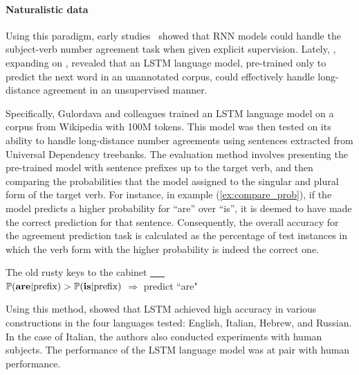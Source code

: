 \paragraph{Naturalistic data} Using this paradigm, early studies~\citep{linzen-etal-2016-assessing,bernardy-lappin-2017-using} showed that RNN models could handle the subject-verb number agreement task when given explicit supervision. Lately, \cite{gulordava-etal-2018-colorless}, expanding on \cite{linzen-etal-2016-assessing}, revealed that an LSTM language model, pre-trained only to predict the next word in an unannotated corpus, could effectively handle long-distance agreement in an unsupervised manner. 

Specifically, Gulordava and colleagues trained an LSTM language model on a corpus from Wikipedia with 100M tokens. This model was then tested on its ability to handle long-distance number agreements using sentences extracted from Universal Dependency treebanks. The evaluation method involves presenting the pre-trained model with sentence prefixes up to the target verb, and then comparing the probabilities that the model assigned to the singular and plural form of the target verb. For instance, in example (\ref{ex:compare_prob}), if the model predicts a higher probability for ``are'' over ``is'', it is deemed to have made the correct prediction for that sentence. Consequently, the overall accuracy for the agreement prediction task is calculated as the percentage of test instances in which the verb form with the higher probability is indeed the correct one.
\begin{exe}
   \ex\label{ex:compare_prob}
The old rusty keys to the cabinet \underline{\ \ \ }   \\
$\mathbb{P}(\textrm{\bf are}|\textrm{prefix}) >
      \mathbb{P}(\textrm{\bf is}|\textrm{prefix})$ $\Rightarrow$ predict ``are" 
\end{exe}

\noindent Using this method, \cite{gulordava-etal-2018-colorless} showed that LSTM achieved high accuracy in various constructions in the four languages tested: English, Italian, Hebrew, and Russian. In the case of Italian, the authors also conducted experiments with human subjects. The performance of the LSTM language model was at pair with human performance. 

